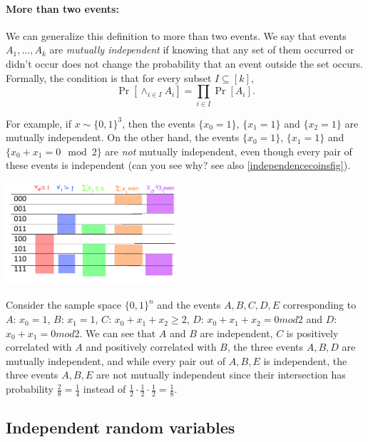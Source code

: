 \paragraph{More than two events:} We can generalize this definition to
more than two events. We say that events \(A_1,\ldots,A_k\) are
\emph{mutually independent} if knowing that any set of them occurred or
didn't occur does not change the probability that an event outside the
set occurs. Formally, the condition is that for every subset
\(I \subseteq [k]\), \[
\Pr[ \wedge_{i\in I} A_i] =\prod_{i\in I} \Pr[A_i].
\]

For example, if \(x\sim \{0,1\}^3\), then the events \(\{ x_0=1 \}\),
\(\{ x_1 = 1\}\) and \(\{x_2 = 1 \}\) are mutually independent. On the
other hand, the events \(\{x_0 = 1 \}\), \(\{x_1 = 1\}\) and
\(\{ x_0 + x_1 = 0 \mod 2 \}\) are \emph{not} mutually independent, even
though every pair of these events is independent (can you see why? see
also \cref{independencecoinsfig}).


\begin{marginfigure}
\centering
\includegraphics[width=\linewidth, height=1.5in, keepaspectratio]{../figure/independencecoins.png}
\caption{Consider the sample space \(\{0,1\}^n\) and the events
\(A,B,C,D,E\) corresponding to \(A\): \(x_0=1\), \(B\): \(x_1=1\),
\(C\): \(x_0+x_1+x_2 \geq 2\), \(D\): \(x_0+x_1+x_2 = 0 mod 2\) and
\(D\): \(x_0+x_1 = 0 mod 2\). We can see that \(A\) and \(B\) are
independent, \(C\) is positively correlated with \(A\) and positively
correlated with \(B\), the three events \(A,B,D\) are mutually
independent, and while every pair out of \(A,B,E\) is independent, the
three events \(A,B,E\) are not mutually independent since their
intersection has probability \(\tfrac{2}{8}=\tfrac{1}{4}\) instead of
\(\tfrac{1}{2}\cdot \tfrac{1}{2} \cdot \tfrac{1}{2} = \tfrac{1}{8}\).}
\label{independencecoinsfig}
\end{marginfigure}

\subsection{Independent random
variables}\label{Independent-random-variab}

